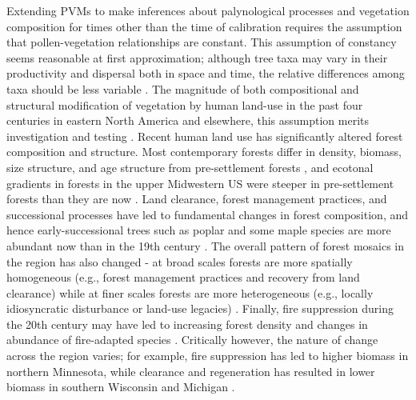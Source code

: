 \documentclass[12pt]{article}
\begin{document}

Extending PVMs to make inferences about palynological processes and
vegetation composition for times other than the time of calibration
requires the assumption that pollen-vegetation relationships are
constant. This assumption of constancy seems reasonable at first
approximation; although tree taxa may vary in their productivity and
dispersal both in space and time, the relative differences among taxa
should be less variable \citep{parsons1981statistical}.  The magnitude
of both compositional and structural modification of vegetation by
human land-use in the past four centuries in eastern North America and
elsewhere, this assumption merits investigation and testing
\citep{kujawa2016}. Recent human land use has significantly altered
forest composition and structure. Most contemporary forests differ in
density, biomass, size structure, and age structure from
pre-settlement forests \citep{leahy2003comparison,
  schulte2007homogenization, rhemtulla2009legacies, goring_witness},
and ecotonal gradients in forests in the upper Midwestern US were
steeper in pre-settlement forests than they are now
\citep{goring_witness}. Land clearance, forest management practices,
and successional processes have led to fundamental changes in forest
composition, and hence early-successional trees such as poplar and
some maple species are more abundant now than in the 19th century
\citep{thompson2013four, goring_witness}. The overall pattern of
forest mosaics in the region has also changed - at broad scales
forests are more spatially homogeneous (e.g., forest management
practices and recovery from land clearance) while at finer scales
forests are more heterogeneous (e.g., locally idiosyncratic
disturbance or land-use legacies) \citep{thompson2013four,
  wang2007spatial, li2015drivers, goring_witness}. Finally, fire
suppression during the 20th century may have led to increasing forest
density and changes in abundance of fire-adapted species
\citep{nowacki2008demise}. Critically however, the nature of change
across the region varies; for example, fire suppression has led to
higher biomass in northern Minnesota, while clearance and regeneration
has resulted in lower biomass in southern Wisconsin and Michigan
\citep{goring_witness}.
\end{document}
